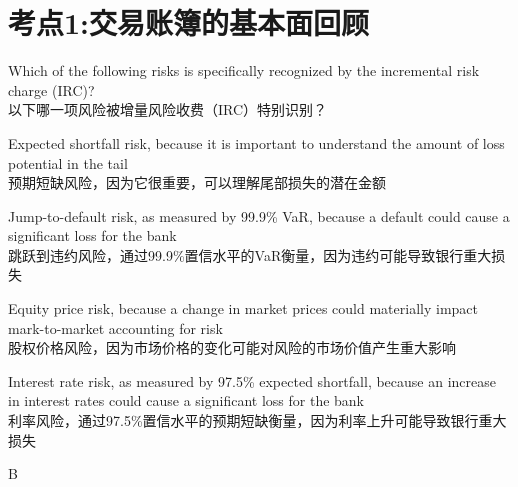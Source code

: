 \documentclass{article}
\newcounter{question} %
\begin{document}
 \tableofcontents %
\newpage




\section{考点1:交易账簿的基本面回顾}
\setcounter{question}{0}

\begin{question}
    Which of the following risks is specifically recognized by the incremental risk charge (IRC)?\\
    以下哪一项风险被增量风险收费（IRC）特别识别？
    \end{question}
    
    \begin{choices}
        \item Expected shortfall risk, because it is important to understand the amount of loss potential in the tail\\
        预期短缺风险，因为它很重要，可以理解尾部损失的潜在金额
        \item Jump-to-default risk, as measured by 99.9\% VaR, because a default could cause a significant loss for the bank\\
        跳跃到违约风险，通过99.9\%置信水平的VaR衡量，因为违约可能导致银行重大损失
        \item Equity price risk, because a change in market prices could materially impact mark-to-market accounting for risk\\
        股权价格风险，因为市场价格的变化可能对风险的市场价值产生重大影响
        \item Interest rate risk, as measured by 97.5\% expected shortfall, because an increase in interest rates could cause a significant loss for the bank\\
        利率风险，通过97.5\%置信水平的预期短缺衡量，因为利率上升可能导致银行重大损失
    \end{choices}
    
    \begin{correctanswer}
        B
    \end{correctanswer}
    
\end{document}
